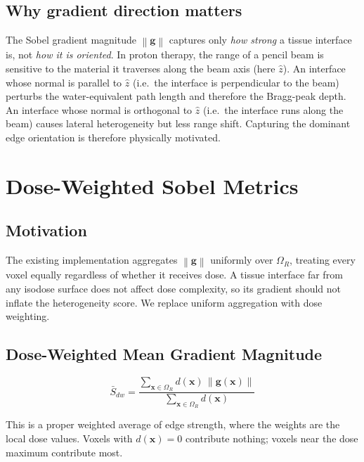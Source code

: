 \documentclass[11pt,a4paper]{article}
\newcommand{\vx}{\mathbf{x}}
\newcommand{\vg}{\mathbf{g}}
\newcommand{\norm}[1]{\left\|#1\right\|}
\begin{document}
\subsection*{Why gradient direction matters}

The Sobel gradient magnitude $\norm{\vg}$ captures only \emph{how strong} a
tissue interface is, not \emph{how it is oriented}.
In proton therapy, the range of a pencil beam is sensitive to the material it
traverses along the beam axis (here $\hat{z}$).
An interface whose normal is parallel to $\hat{z}$ (i.e.\ the interface is
perpendicular to the beam) perturbs the water-equivalent path length and
therefore the Bragg-peak depth.
An interface whose normal is orthogonal to $\hat{z}$ (i.e.\ the interface
runs along the beam) causes lateral heterogeneity but less range shift.
Capturing the dominant edge orientation is therefore physically motivated.

\section{Dose-Weighted Sobel Metrics}
\label{sec:dw_metrics}

\subsection{Motivation}

The existing implementation aggregates $\norm{\vg}$ uniformly over
$\Omega_R$, treating every voxel equally regardless of whether it receives
dose.
A tissue interface far from any isodose surface does not affect dose
complexity, so its gradient should not inflate the heterogeneity score.
We replace uniform aggregation with dose weighting.

\subsection{Dose-Weighted Mean Gradient Magnitude}

\begin{equation}
    \boxed{
    \bar{S}_{dw}
    = \frac{\displaystyle\sum_{\vx \in \Omega_R} d(\vx)\,\norm{\vg(\vx)}}
           {\displaystyle\sum_{\vx \in \Omega_R} d(\vx)}
    }
    \label{eq:dw_mean}
\end{equation}

This is a proper weighted average of edge strength, where the weights are the
local dose values.
Voxels with $d(\vx) = 0$ contribute nothing; voxels near the dose maximum
contribute most.
\end{document}
